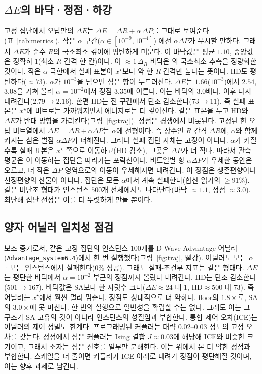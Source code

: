 \documentclass[10pt, conference]{IEEEtran}
\begin{document}
\subsection{$\Delta E$의 바닥·정점·하강}
\label{sec:vpc}
고정 집단에서 오답만의 $\Delta E$는 $\Delta E = \Delta R + \alpha\,\Delta P$를
그대로 보여준다(표~\ref{tab:metrics}). 작은 $\alpha$ 구간($\alpha\in[10^{-9},10^{-4}]$)
에선 $\alpha\Delta P$가 무시할 만하다. 그래서 $\Delta E$가 순수 $R$의 국소최소
깊이에 평탄하게 머문다. 이 바닥값은 평균 $1.10$, 중앙값은 정확히 $1$(최소 $R$
간격 한 칸)이다. 이 $\approx1\,\Delta_R$ 바닥은 \cite{pelofske2024hardened}의 국소최소
추측을 정량화한 것이다. 작은 $\alpha$ 극한에서 실패 표본이 $x^\star$보다 약 한 $R$
간격만 높다는 뜻이다. HD도 평탄하다($\approx73$). $\alpha$가 $10^{-3}$을 넘으면 심은
항이 두드러진다. $\Delta E$는 $1.66$($10^{-3}$)에서 $2.54$, $3.08$을 거쳐 올라
$\alpha{=}10^{-2}$에서 정점 $3.35$에 이른다. 이는 바닥의 $3.0$배다. 이후 다시
내려간다($2.79\to2.16$). 한편 HD는 전 구간에서 단조 감소한다($73\to11$). 즉 실패
표본은 $x^\star$에 비트로는 가까워지면서 에너지로는 더 깊어진다. 같은 표본을 두고
HD와 $\Delta E$가 반대 방향을 가리킨다(그림~\ref{fig:traj}). 정점은
경쟁에서 비롯된다. 고정된 한 오답 비트열에서 $\Delta E = \Delta R + \alpha\Delta P$는
$\alpha$에 선형이다. 즉 상수인 $R$ 간격 $\Delta R$에, $\alpha$와 함께 커지는 심은
벌점 $\alpha\Delta P$가 더해진다. 그러나 실패 집단 자체는 고정이 아니다. $\alpha$가
커질수록 실패 표본은 $x^\star$ 쪽으로 이동하고(HD 감소), 그곳은 $\Delta P$가 더
작다. 따라서 관측 평균은 이 이동하는 집단을 따라가는 포락선이다. 비트열별 항
$\alpha\Delta P$가 우세한 동안은 오르고, 더 작은 $\Delta P$ 영역으로의 이동이
우세해지면 내려간다. 이 정점은 생존편향이나 선정편향의 산물이 아니다.
집단은 모든 $\alpha$에서 계속 실패한다(합산 읽기의 $\geq91\%$). 같은 비단조 형태가
인스턴스 $500$개 전체에서도 나타난다(바닥 $\approx1.1$, 정점 $\approx3.0$). 최난해
집단 선정은 이를 더 뚜렷하게 만들 뿐이다.

\subsection{양자 어닐러 일치성 점검}
\label{sec:qpu}
보조 증거로서, 같은 고정 집단의 인스턴스
$100$개를 D-Wave Advantage 어닐러(\texttt{Advantage\_system6.4})에서 한 번
실행했다(그림~\ref{fig:traj}, 빨강).
어닐러도 모든 $\alpha$·모든 인스턴스에서 실패한다($0\%$ 성공). 그래도 실패-조건부
지표는 같은 형태다. $\Delta E$는 평탄한 바닥에서 $\alpha{=}10^{-2}$ 부근의 정점까지
올랐다 내려간다. HD는 단조 감소한다($501\to167$). 바닥값은 SA보다 한 자릿수
크다($\Delta E\approx24$ 대 $1$, HD$\approx500$ 대 $73$). 즉 어닐러는 $x^\star$에서
훨씬 멀리 멈춘다. 정점도 상대적으로 더 약하다. floor의 $1.8\times$로, SA의
$3.0\times$에 못 미친다. 한 번의 실행으로 일반성을 확립할 수는 없다. 그래도 이는
그 구조가 SA 고유의 것이 아니라 인스턴스의 성질임과 부합한다. 통합 제어
오차(ICE)는 어닐러의 제어 정밀도 한계다. 프로그래밍된 커플러는 대략 $0.02$--$0.03$
정도의 고정 오차를 갖는다. 정점에서 심은 커플러는 Ising 결합 $J\approx0.03$에 해당해
ICE와 비슷한 크기이고, 그래서 소자는 심은 신호를 일부만 분해한다. 이는 위에서 본 더
약한 정점과 부합한다. 스케일을 더 줄이면 커플러가 ICE 아래로 내려가 정점이
평탄해질 것이며, 이는 향후 과제로 남긴다.
\end{document}
